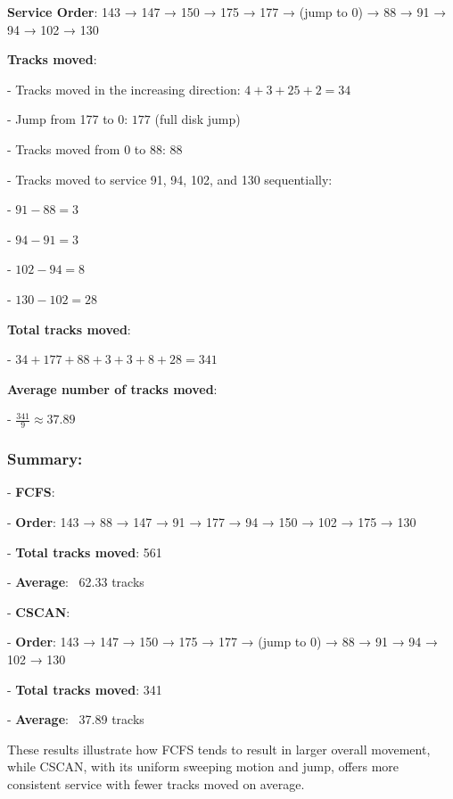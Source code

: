 \documentclass[a4paper]{book}
\begin{document}
\textbf{Service Order}: 143 → 147 → 150 → 175 → 177 → (jump to 0) → 88 → 91 → 94 → 102 → 130

\textbf{Tracks moved}:

- Tracks moved in the increasing direction: \(4 + 3 + 25 + 2 = 34\)

- Jump from 177 to 0: \(177\) (full disk jump)

- Tracks moved from 0 to 88: \(88\)

- Tracks moved to service 91, 94, 102, and 130 sequentially:

  - \(91 - 88 = 3\)

  - \(94 - 91 = 3\)

  - \(102 - 94 = 8\)

  - \(130 - 102 = 28\)


\textbf{Total tracks moved}:

- \(34 + 177 + 88 + 3 + 3 + 8 + 28 = 341\)


\textbf{Average number of tracks moved}:

- \(\frac{341}{9} \approx 37.89\)


\subsubsection{\textbf{Summary}:}

- \textbf{FCFS}:

  
  - \textbf{Order}: 143 → 88 → 147 → 91 → 177 → 94 → 150 → 102 → 175 → 130

  - \textbf{Total tracks moved}: 561

  - \textbf{Average}: ~62.33 tracks


- \textbf{CSCAN}:

  
  - \textbf{Order}: 143 → 147 → 150 → 175 → 177 → (jump to 0) → 88 → 91 → 94 → 102 → 130

  - \textbf{Total tracks moved}: 341

  - \textbf{Average}: ~37.89 tracks


These results illustrate how FCFS tends to result in larger overall movement, while CSCAN, with its uniform sweeping motion and jump, offers more consistent service with fewer tracks moved on average.
\end{document}

